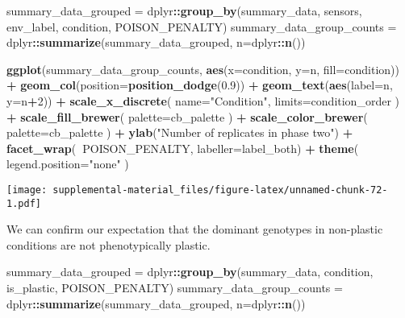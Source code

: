 \documentclass[]{book}
\newenvironment{Shaded}{\begin{snugshade}}{\end{snugshade}}
\newcommand{\DataTypeTok}[1]{\textcolor[rgb]{0.13,0.29,0.53}{#1}}
\newcommand{\DecValTok}[1]{\textcolor[rgb]{0.00,0.00,0.81}{#1}}
\newcommand{\FloatTok}[1]{\textcolor[rgb]{0.00,0.00,0.81}{#1}}
\newcommand{\KeywordTok}[1]{\textcolor[rgb]{0.13,0.29,0.53}{\textbf{#1}}}
\newcommand{\NormalTok}[1]{#1}
\newcommand{\OperatorTok}[1]{\textcolor[rgb]{0.81,0.36,0.00}{\textbf{#1}}}
\newcommand{\StringTok}[1]{\textcolor[rgb]{0.31,0.60,0.02}{#1}}
\begin{document}
\begin{Shaded}
\begin{Highlighting}[]
\NormalTok{summary_data_grouped =}\StringTok{ }\NormalTok{dplyr}\OperatorTok{::}\KeywordTok{group_by}\NormalTok{(summary_data, sensors, env_label, condition, POISON_PENALTY)}
\NormalTok{summary_data_group_counts =}\StringTok{ }\NormalTok{dplyr}\OperatorTok{::}\KeywordTok{summarize}\NormalTok{(summary_data_grouped, }\DataTypeTok{n=}\NormalTok{dplyr}\OperatorTok{::}\KeywordTok{n}\NormalTok{())}

\KeywordTok{ggplot}\NormalTok{(summary_data_group_counts, }\KeywordTok{aes}\NormalTok{(}\DataTypeTok{x=}\NormalTok{condition, }\DataTypeTok{y=}\NormalTok{n, }\DataTypeTok{fill=}\NormalTok{condition)) }\OperatorTok{+}
\StringTok{  }\KeywordTok{geom_col}\NormalTok{(}\DataTypeTok{position=}\KeywordTok{position_dodge}\NormalTok{(}\FloatTok{0.9}\NormalTok{)) }\OperatorTok{+}
\StringTok{  }\KeywordTok{geom_text}\NormalTok{(}\KeywordTok{aes}\NormalTok{(}\DataTypeTok{label=}\NormalTok{n, }\DataTypeTok{y=}\NormalTok{n}\OperatorTok{+}\DecValTok{2}\NormalTok{)) }\OperatorTok{+}
\StringTok{  }\KeywordTok{scale_x_discrete}\NormalTok{(}
    \DataTypeTok{name=}\StringTok{"Condition"}\NormalTok{,}
    \DataTypeTok{limits=}\NormalTok{condition_order}
\NormalTok{  ) }\OperatorTok{+}
\StringTok{  }\KeywordTok{scale_fill_brewer}\NormalTok{(}
    \DataTypeTok{palette=}\NormalTok{cb_palette}
\NormalTok{  ) }\OperatorTok{+}
\StringTok{  }\KeywordTok{scale_color_brewer}\NormalTok{(}
    \DataTypeTok{palette=}\NormalTok{cb_palette}
\NormalTok{  ) }\OperatorTok{+}
\StringTok{  }\KeywordTok{ylab}\NormalTok{(}\StringTok{"Number of replicates in phase two"}\NormalTok{) }\OperatorTok{+}
\StringTok{  }\KeywordTok{facet_wrap}\NormalTok{(}\OperatorTok{~}\NormalTok{POISON_PENALTY, }\DataTypeTok{labeller=}\NormalTok{label_both) }\OperatorTok{+}
\StringTok{  }\KeywordTok{theme}\NormalTok{(}
    \DataTypeTok{legend.position=}\StringTok{"none"}
\NormalTok{  )}
\end{Highlighting}
\end{Shaded}

\texttt{[image: supplemental-material\_files/figure-latex/unnamed-chunk-72-1.pdf]}

We can confirm our expectation that the dominant genotypes in non-plastic conditions are not phenotypically plastic.

\begin{Shaded}
\begin{Highlighting}[]
\NormalTok{summary_data_grouped =}\StringTok{ }\NormalTok{dplyr}\OperatorTok{::}\KeywordTok{group_by}\NormalTok{(summary_data, condition, is_plastic, POISON_PENALTY)}
\NormalTok{summary_data_group_counts =}\StringTok{ }\NormalTok{dplyr}\OperatorTok{::}\KeywordTok{summarize}\NormalTok{(summary_data_grouped, }\DataTypeTok{n=}\NormalTok{dplyr}\OperatorTok{::}\KeywordTok{n}\NormalTok{())}
\end{Highlighting}
\end{Shaded}
\end{document}
